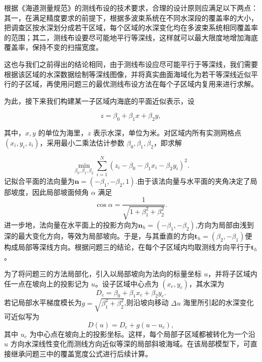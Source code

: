 \documentclass[UTF-8,a4paper,zihao=-4]{ctexart}
\begin{document}
根据《海道测量规范》的测线布设的技术要求，合理的设计原则应满足以下两点：其一，在满足精度要求的前提下，根据多波束系统在不同水深段的覆盖率的大小，把调查区按水深划分成若干区域，每个区域的水深变化均在多波束系统相同覆盖率的范围；其二，测线布设要尽可能地平行等深线，这样就可以最大限度地增加海底覆盖率，保持不变的扫描宽度。

这也与我们之前得出的结论相同，由于测线布设应尽可能平行于等深线，我们需要根据该区域的水深数据绘制等深线图像，并将真实曲面海域化为若干等深线近似平行的子区域，再使用问题三的最优测线布设方法在每个子区域内复用来进行求解。

为此，接下来我们构建某一子区域内海底的平面近似表示，设

\begin{equation}
z=\beta_0+\beta_1 x+\beta_2 y,
\end{equation}

其中，$x,y$ 的单位为海里，$z$ 表示水深，单位为米。对区域内所有实测网格点 $(x_i,y_i,z_i)$，采用最小二乘法估计参数 $\beta_0,\beta_1,\beta_2$，即求解

\begin{equation}
\min_{\beta_0,\beta_1,\beta_2}
\sum_{i=1}^{N}
\left(
z_i-\beta_0-\beta_1 x_i-\beta_2 y_i
\right)^2 .
\end{equation}
记拟合平面的法向量为$\bm{n}=(-\beta_1,-\beta_2,1)$.由于该法向量与水平面的夹角决定了局部坡度，因此局部坡面倾角 $\alpha$ 满足
\begin{equation}
\cos\alpha
=
\frac{1}{\sqrt{1+\beta_1^2+\beta_2^2}}.
\end{equation}
进一步地，法向量在水平面上的投影方向为$\bm{n}_h=(-\beta_1,-\beta_2)$,方向为局部由浅到深的最大变化方向，等效为局部坡向。于是，与其垂直的方向$\bm{t}_h=(\beta_2,-\beta_1)$便构成局部等深线方向。根据问题三的结论，在每个子区域内均取测线方向平行于$\bm{t}_h$。

为了将问题三的方法局部化，引入以局部坡向为法向的标量坐标 $u$，并将子区域内任一点在坡向上的投影记为 $u$。设子区域中心点为 $(x_c,y_c)$，其水深为
\begin{equation}
D_c=\beta_0+\beta_1 x_c+\beta_2 y_c.
\end{equation}
若记局部水平梯度模长为$g=\sqrt{\beta_1^2+\beta_2^2}$,则沿坡向移动 $\Delta u$ 海里所引起的水深变化可近似写为
\begin{equation}
D(u)=D_c+g(u-u_c),
\end{equation}
其中 $u_c$ 为中心点在坡向上的投影坐标。这样，每个局部子区域都被转化为一个沿 $u$ 方向水深线性变化而测线方向近似等深的局部斜坡海域。在该局部模型下，可直接继承问题三中的覆盖宽度公式进行后续计算。
\end{document}
